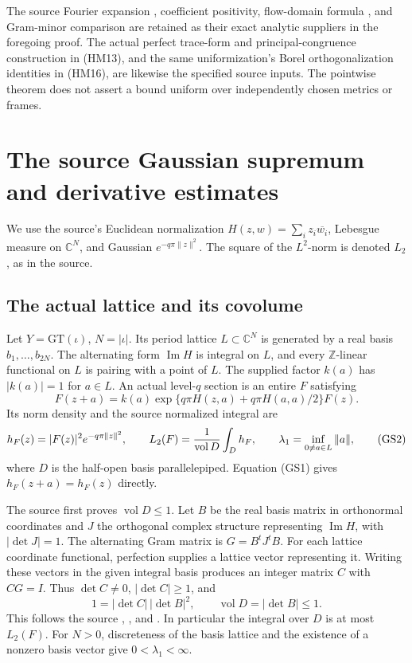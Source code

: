 The source Fourier expansion , coefficient
positivity, flow-domain formula ,
and Gram-minor comparison  are retained as
their exact analytic suppliers in the foregoing proof.
The actual perfect trace-form and principal-congruence
construction in (HM13), and the same uniformization's Borel
orthogonalization identities in (HM16), are likewise the
specified source inputs. The pointwise theorem does not assert
a bound uniform over independently chosen metrics or frames.

\section{The source Gaussian supremum and derivative estimates}
\label{sec:sr-source-gaussian-sup}
We use the source's Euclidean normalization
\(H(z,w)=\sum_i z_i\overline{w_i}\), Lebesgue measure on
\(\mathbb C^N\), and Gaussian \(e^{-q\pi\|z\|^2}\).
The square of the \(L^2\)-norm is denoted \(L_2\), as in the source.

\subsection{The actual lattice and its covolume}
Let \(Y=\mathrm{GT}(\iota)\), \(N=|\iota|\).
Its period lattice \(L\subset\mathbb C^N\) is generated by a
real basis \(b_1,\ldots,b_{2N}\).
The alternating form \(\operatorname{Im}H\) is integral on \(L\),
and every \(\mathbb Z\)-linear functional on \(L\) is pairing
with a point of \(L\). The supplied factor \(k(a)\) has
\(|k(a)|=1\) for \(a\in L\).
An actual level-\(q\) section is an entire \(F\) satisfying
\[
 F(z+a)=k(a)\exp\{q\pi H(z,a)+q\pi H(a,a)/2\}F(z).
 \tag{GS1}\label{eq:sr-source-GT-section}
\]
Its norm density and the source normalized integral are
\[
 h_F(z)=|F(z)|^2e^{-q\pi\|z\|^2},\qquad
 L_2(F)={1\over\operatorname{vol}D}\int_Dh_F,\qquad
 \lambda_1=\inf_{0\ne a\in L}\|a\|,
 \tag{GS2}\label{eq:sr-source-GT-norm}
\]
where \(D\) is the half-open basis parallelepiped.
Equation (GS1) gives \(h_F(z+a)=h_F(z)\) directly.

The source first proves \(\operatorname{vol}D\le1\).
Let \(B\) be the real basis matrix in orthonormal coordinates
and \(J\) the orthogonal complex structure representing
\(\operatorname{Im}H\), with \(|\det J|=1\).
The alternating Gram matrix is \(G=B^tJ^tB\).
For each lattice coordinate functional, perfection supplies a
lattice vector representing it.
Writing these vectors in the given integral basis produces
an integer matrix \(C\) with \(CG=I\).
Thus \(\det C\ne0\), \(|\det C|\ge1\), and
\[
                  1=|\det C|\,|\det B|^2,\qquad
                           \operatorname{vol}D=|\det B|\le1 .
 \tag{GS3}\label{eq:sr-source-GT-volume}
\]
This follows the source
, ,
and .
In particular the integral over \(D\) is at most \(L_2(F)\).
For \(N>0\), discreteness of the basis lattice and the existence
of a nonzero basis vector give \(0<\lambda_1<\infty\).

